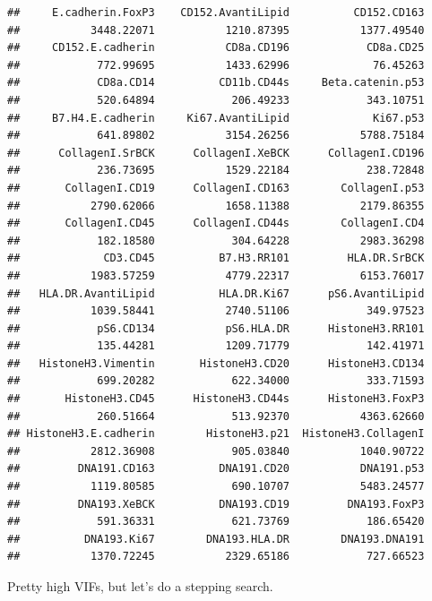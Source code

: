 \documentclass[a4paper]{article}\usepackage[]{graphicx}\usepackage[]{color}
\makeatletter
\newenvironment{kframe}{%
 \def\at@end@of@kframe{}%
 \ifinner\ifhmode%
  \def\at@end@of@kframe{\end{minipage}}%
  \begin{minipage}{\columnwidth}%
 \fi\fi%
 \def\FrameCommand##1{\hskip\@totalleftmargin \hskip-\fboxsep
 \colorbox{shadecolor}{##1}\hskip-\fboxsep
     \hskip-\linewidth \hskip-\@totalleftmargin \hskip\columnwidth}%
 \MakeFramed {\advance\hsize-\width
   \@totalleftmargin\z@ \linewidth\hsize
   \@setminipage}}%
 {\par\unskip\endMakeFramed%
 \at@end@of@kframe}
\newenvironment{knitrout}{}{} %
\makeatother
\begin{document}
\begin{knitrout}
\begin{kframe}
\begin{verbatim}
##     E.cadherin.FoxP3    CD152.AvantiLipid          CD152.CD163 
##           3448.22071           1210.87395           1377.49540 
##     CD152.E.cadherin           CD8a.CD196            CD8a.CD25 
##            772.99695           1433.62996             76.45263 
##            CD8a.CD14          CD11b.CD44s     Beta.catenin.p53 
##            520.64894            206.49233            343.10751 
##     B7.H4.E.cadherin     Ki67.AvantiLipid             Ki67.p53 
##            641.89802           3154.26256           5788.75184 
##      CollagenI.SrBCK      CollagenI.XeBCK      CollagenI.CD196 
##            236.73695           1529.22184            238.72848 
##       CollagenI.CD19      CollagenI.CD163        CollagenI.p53 
##           2790.62066           1658.11388           2179.86355 
##       CollagenI.CD45      CollagenI.CD44s        CollagenI.CD4 
##            182.18580            304.64228           2983.36298 
##             CD3.CD45          B7.H3.RR101         HLA.DR.SrBCK 
##           1983.57259           4779.22317           6153.76017 
##   HLA.DR.AvantiLipid          HLA.DR.Ki67      pS6.AvantiLipid 
##           1039.58441           2740.51106            349.97523 
##            pS6.CD134           pS6.HLA.DR      HistoneH3.RR101 
##            135.44281           1209.71779            142.41971 
##   HistoneH3.Vimentin       HistoneH3.CD20      HistoneH3.CD134 
##            699.20282            622.34000            333.71593 
##       HistoneH3.CD45      HistoneH3.CD44s      HistoneH3.FoxP3 
##            260.51664            513.92370           4363.62660 
## HistoneH3.E.cadherin        HistoneH3.p21  HistoneH3.CollagenI 
##           2812.36908            905.03840           1040.90722 
##         DNA191.CD163          DNA191.CD20           DNA191.p53 
##           1119.80585            690.10707           5483.24577 
##         DNA193.XeBCK          DNA193.CD19         DNA193.FoxP3 
##            591.36331            621.73769            186.65420 
##          DNA193.Ki67        DNA193.HLA.DR        DNA193.DNA191 
##           1370.72245           2329.65186            727.66523
\end{verbatim}
\end{kframe}
\end{knitrout}

Pretty high VIFs, but let's do a stepping search.
\end{document}
